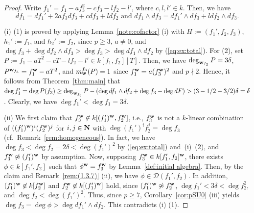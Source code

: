 \documentclass{amsart}
\theoremstyle{plain}
\theoremstyle{definition}
\newcommand{\N}{{\bf N}}
\newcommand{\w}{{\bf w}}
\begin{document}
\begin{proof}
Write $f_1'=f_1-af_3^2-cf_3-lf_2-l'$, 
where $c,l,l'\in k$. 
Then, we have 
\begin{equation}\label{eq:big ex}
df_1=df_1'+2af_3df_3+cdf_3+ldf_2
\text{ \ and \ }
df_1\wedge df_3=df_1'\wedge df_3+ldf_2\wedge df_3. 
\end{equation}


(i) 
(1) is proved by applying Lemma~\ref{note:cofactor} (i) 
with 
$H:=(f_1',f_2,f_3)$, $h_1':=f_1$, and $h_2':=f_2$, 
since $p\ge 3$, 
$a\ne 0$, 
and $\deg f_3+\deg df_2\wedge df_3>\deg f_3>\deg df_1\wedge df_2$ 
by (\ref{eq:ex:total}). 
For (2), 
set $P:=f_1-aT^2-cT-lf_2-l'\in k[f_1,f_2][T]$. 
Then, we have 
$\deg _{\w _{f_3}}P=3\delta $, $P^{\w _{f_3}}=f_1^{\w }-aT^2$, 
and $m_{\w }^{f_3}(P)=1$ 
since $f_1^{\w }=a(f_3^{\w })^2$ and $p\nmid 2$. 
Hence, 
it follows from Theorem~\ref{thm:main} that 
$\deg f_1'=\deg P(f_3)\ge 
\deg _{\w _{f_3}}P-(\deg df_1\wedge df_2+\deg f_3-\deg dF)
>(3-1/2-3/2)\delta =\delta $. 
Clearly, we have $\deg f_1'<\deg f_1=3\delta $. 



(ii) 
We first claim that 
$f_3^{\w }\not\in k[(f_1')^{\w },f_2^{\w }]$, 
i.e., 
$f_3^{\w }$ is not a $k$-linear combination of 
$((f_1')^{\w })^i(f_2^{\w })^j$ 
for $i,j\in \N $ with $\deg {(f_1')^if_2^j}=\deg f_3$ 
(cf.~Remark~\ref{rem:homogeneous}). 
In fact, 
we have 
$\deg f_3<\deg f_2=2\delta <\deg (f_1')^2$ 
by (\ref{eq:ex:total}) and~(i)~(2), 
and $f_3^{\w }\not\approx (f_1')^{\w }$ by assumption. 
Now, supposing $f_3^{\w }\in k[f_1',f_2]^{\w }$, 
there exists $\phi \in k[f_1',f_2]$ such that $\phi ^{\w }=f_3^{\w }$ 
by Lemma~\ref{def:initial algebra}. 
Then, by the claim and Remark~\ref{rem:(1.3.7)} (ii), 
we have $\phi \in \mathcal{D}(f_1',f_2)$. 
In addition, 
$(f_1')^{\w }\not\in k[f_2^{\w }]$ and 
$f_2^{\w }\not\in k[(f_1')^{\w }]$ hold, 
since $(f_1')^{\w }\not\approx f_2^{\w }$, 
$\deg f_1'<3\delta <\deg f_2^2$, 
and $\deg f_2<\deg (f_1')^2$. 
Thus, since $p\ge 7$, 
Corollary~\ref{cor:pSU0} (iii) yields 
$\deg f_3=\deg \phi >\deg df_1'\wedge df_2$. 
This contradicts (i) (1). 





\end{proof}
\end{document}
